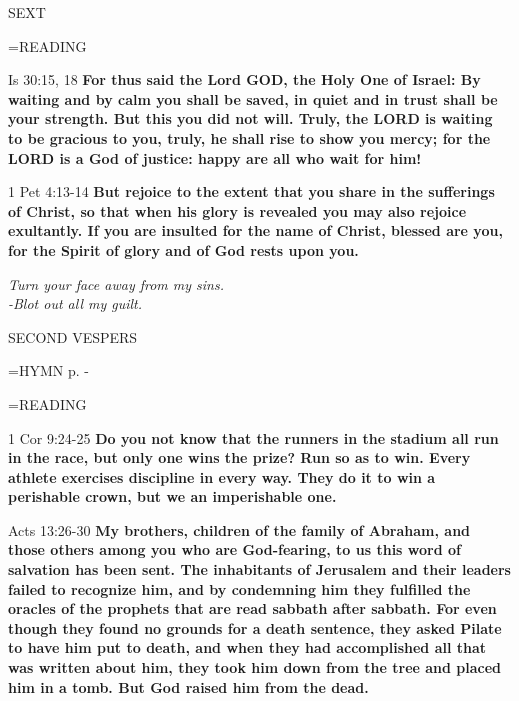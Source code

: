\begin{flushleft}\normalsize SEXT\\\end{flushleft}

\hangindent=\parindent \small READING
\begin{description}[labelindent=\parindent, leftmargin=*]
\item [Week 1-4:]   Is 30:15, 18 \textbf{  For thus said the Lord GOD, the Holy One of Israel: By waiting and by calm you shall be saved, in quiet and in trust shall be your strength. But this you did not will. Truly, the LORD is waiting to be gracious to you, truly, he shall rise to show you mercy; for the LORD is a God of justice: happy are all who wait for him!}
\item [Week 5:]   1 Pet 4:13-14 \textbf{  But rejoice to the extent that you share in the sufferings of Christ, so that when his glory is revealed you may also rejoice exultantly. If you are insulted for the name of Christ, blessed are you, for the Spirit of glory and of God rests upon you.}
\end{description}


\begin{center}
\textit{Turn your face away from my sins.\\
-Blot out all my guilt.}
\end{center}

\begin{flushleft}\normalsize SECOND VESPERS\\\end{flushleft}

\hangindent=\parindent \small{\uppercase{HYMN} p.  \pageref{lent:firstHymn} - \pageref{lent:lastHymn}\\}

\hangindent=\parindent \small READING
\begin{description}[labelindent=\parindent, leftmargin=*]
\item [Week 1-4:]   1 Cor 9:24-25 \textbf{  Do you not know that the runners in the stadium all run in the race, but only one wins the prize? Run so as to win. Every athlete exercises discipline in every way. They do it to win a perishable crown, but we an imperishable one.}
\item [Week 5:]   Acts 13:26-30 \textbf{   My brothers, children of the family of Abraham, and those others among you who are God-fearing, to us this word of salvation has been sent. The inhabitants of Jerusalem and their leaders failed to recognize him, and by condemning him they fulfilled the oracles of the prophets that are read sabbath after sabbath. For even though they found no grounds for a death sentence, they asked Pilate to have him put to death, and when they had accomplished all that was written about him, they took him down from the tree and placed him in a tomb. But God raised him from the dead.}
\end{description}

